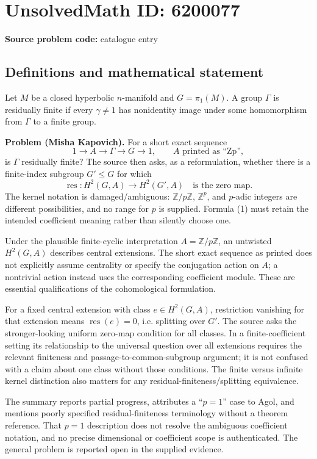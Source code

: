 \documentclass[11pt]{article}
\newcommand{\Z}{\mathbb{Z}}
\begin{document}
\section*{UnsolvedMath ID: 6200077}
\textbf{Source problem code:} catalogue entry
\subsection{Definitions and mathematical statement}
Let $M$ be a closed hyperbolic $n$-manifold and $G=\pi_1(M)$. A group $\Gamma$ is residually finite if every $\gamma\ne1$ has nonidentity image under some homomorphism from $\Gamma$ to a finite group.

\textbf{Problem (Misha Kapovich).} For a short exact sequence
\[
 1\longrightarrow A\longrightarrow\Gamma\longrightarrow G\longrightarrow1,
 \qquad A\text{ printed as ``Zp''},
\]
is $\Gamma$ residually finite? The source then asks, as a reformulation, whether there is a finite-index subgroup $G'\leq G$ for which
\[
 \operatorname{res}:H^2(G,A)\longrightarrow H^2(G',A)
 \quad\text{is the zero map}. \tag{1}
\]
The kernel notation is damaged/ambiguous: $\Z/p\Z$, $\Z^p$, and $p$-adic integers are different possibilities, and no range for $p$ is supplied. Formula (1) must retain the intended coefficient meaning rather than silently choose one.

Under the plausible finite-cyclic interpretation $A=\Z/p\Z$, an untwisted $H^2(G,A)$ describes central extensions. The short exact sequence as printed does not explicitly assume centrality or specify the conjugation action on $A$; a nontrivial action instead uses the corresponding coefficient module. These are essential qualifications of the cohomological formulation.

For a fixed central extension with class $e\in H^2(G,A)$, restriction vanishing for that extension means $\operatorname{res}(e)=0$, i.e. splitting over $G'$. The source asks the stronger-looking uniform zero-map condition for all classes. In a finite-coefficient setting its relationship to the universal question over all extensions requires the relevant finiteness and passage-to-common-subgroup argument; it is not confused with a claim about one class without those conditions. The finite versus infinite kernel distinction also matters for any residual-finiteness/splitting equivalence.

The summary reports partial progress, attributes a ``$p=1$'' case to Agol, and mentions poorly specified residual-finiteness terminology without a theorem reference. That $p=1$ description does not resolve the ambiguous coefficient notation, and no precise dimensional or coefficient scope is authenticated. The general problem is reported open in the supplied evidence.
\end{document}
